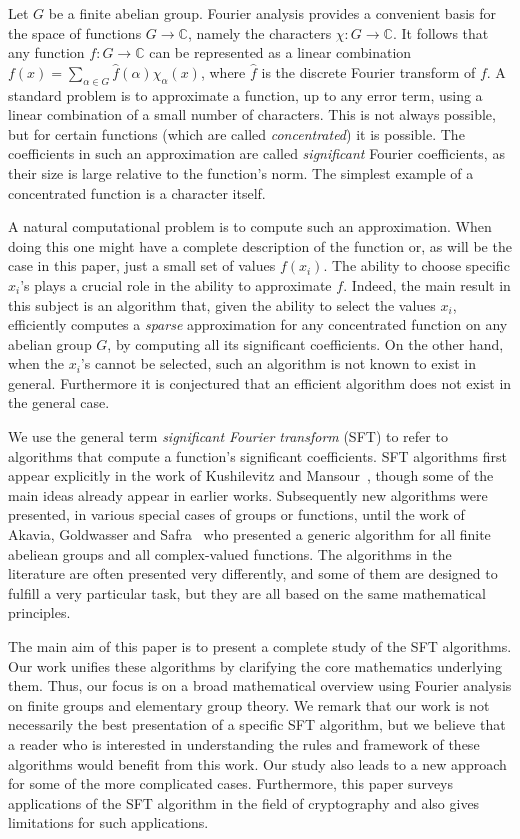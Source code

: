 \documentclass[11pt]{article}
\theoremstyle{definition}
\newcommand{\C}{\mathbb{C}}
\begin{document}
Let $G$ be a finite abelian group.
Fourier analysis provides a convenient basis for the space of functions $G \to \C$,  namely the characters $\chi: G \to \C$. It follows that any function $f: G \to \C$ can be represented as a linear combination $f(x) = \sum_{\alpha \in G} \widehat{f}(\alpha) \chi_\alpha(x)$, where $\widehat{f}$ is the discrete Fourier transform of $f$. A standard problem is to approximate a function, up to any error term, using a linear combination of a small number of characters. This is not always possible, but for certain functions (which are called \emph{concentrated}) it is possible. The coefficients in such an approximation are called \emph{significant} Fourier coefficients, as their size is large relative to the function's norm.
The simplest example of a concentrated function is a character itself.

A natural computational problem is to compute such an approximation.
When doing this one might have a complete description of the function or, as will be the case in this paper, just a small set of values $f(x_i)$. The ability to choose specific $x_i$'s plays a crucial role in the ability to approximate $f$. Indeed, the main result in this subject is an algorithm that, given the ability to select the values $x_i$, efficiently computes a \emph{sparse} approximation for any concentrated function on any abelian group $G$, by computing all its significant coefficients. On the other hand, when the $x_i$'s cannot be selected, such an algorithm is not known to exist in general. Furthermore it is conjectured that an efficient algorithm does not exist in the general case.

We use the general term \emph{significant Fourier transform} (SFT) to refer to algorithms that compute a function's significant coefficients. SFT algorithms first appear explicitly in the work of %
Kushilevitz and Mansour~\cite{KM}, though some of the main ideas already appear in earlier works.
Subsequently new algorithms were presented, in various special cases of groups or functions, until the work of Akavia, Goldwasser and Safra~\cite{AGS} who presented a generic algorithm for all finite abeliean groups and all complex-valued functions.
The algorithms in the literature are often presented very differently, and some of them are designed to fulfill a very particular task, but they are all based on the same mathematical principles.

The main aim of this paper is to present a complete study of the SFT algorithms. Our work unifies these algorithms by clarifying the core mathematics underlying them. Thus, our focus is on a broad mathematical overview using Fourier analysis on finite groups and elementary group theory. We remark that our work is not necessarily the best presentation of a specific SFT algorithm, but we believe that a reader who is interested in understanding the rules and framework of these algorithms would benefit from this work. Our study also leads to a new approach for some of the more complicated cases. Furthermore, this paper surveys applications of the SFT algorithm in the field of cryptography and also gives limitations for such applications.
\end{document}
